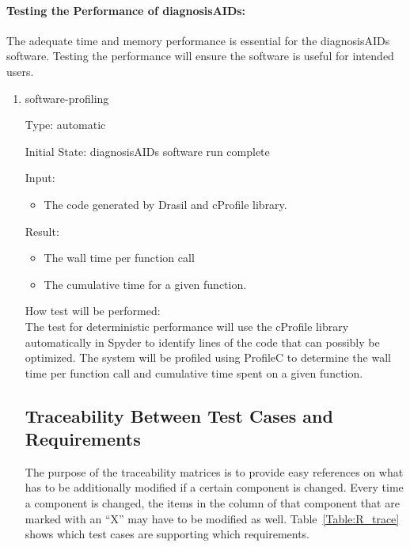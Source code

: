 \documentclass[12pt, titlepage]{article}
\begin{document}
\begin{enumerate}
\paragraph{Testing the Performance of diagnosisAIDs:}

The adequate time and memory performance is essential for the diagnosisAIDs 
software. Testing the performance will ensure the software is useful for 
intended users. 

\begin{enumerate}

\item{software-profiling\\}

Type: automatic
					
Initial State: diagnosisAIDs software run complete
					
Input:
\begin{itemize} %
\item The code generated by Drasil and cProfile library.
\end{itemize}

Result: 
\begin{itemize}
\item The wall time per function call
\item The cumulative time for a given function.
\end{itemize}
				
					
How test will be performed: \\
The test for deterministic performance will use the cProfile library 
automatically in Spyder to identify lines of the code that can possibly be 
optimized. The system will be profiled using ProfileC to determine the wall time 
per function call and cumulative time spent on a given function.\\


\subsection{Traceability Between Test Cases and Requirements}

The purpose of the traceability matrices is to provide easy references on what
has to be additionally modified if a certain component is changed.  Every time a
component is changed, the items in the column of that component that are marked
with an ``X'' may have to be modified as well.  Table~\ref{Table:R_trace} shows 
which test cases are supporting which requirements.



\end{enumerate}
\end{enumerate}
\end{document}
